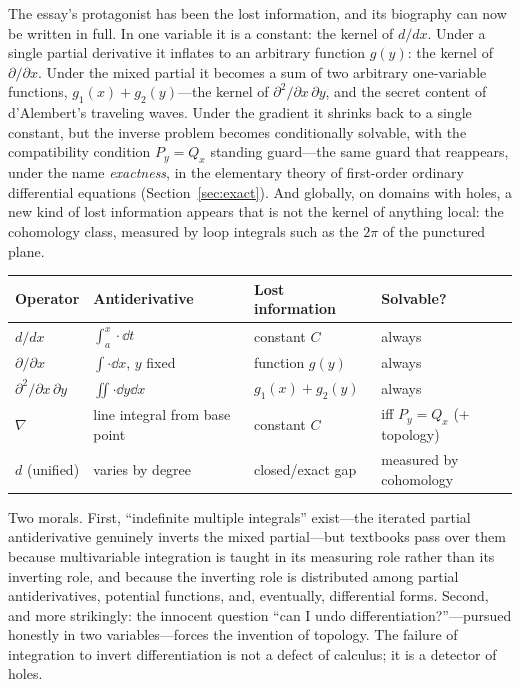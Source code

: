 \documentclass{essay}
\begin{document}
The essay's protagonist has been the lost information, and its biography can now be written in full. In one variable it is a constant: the kernel of $d/dx$. Under a single partial derivative it inflates to an arbitrary function $g(y)$: the kernel of $\partial/\partial x$. Under the mixed partial it becomes a sum of two arbitrary one-variable functions, $g_1(x) + g_2(y)$---the kernel of $\partial^2/\partial x\,\partial y$, and the secret content of d'Alembert's traveling waves. Under the gradient it shrinks back to a single constant, but the inverse problem becomes conditionally solvable, with the compatibility condition $P_y = Q_x$ standing guard---the same guard that reappears, under the name \emph{exactness}, in the elementary theory of first-order ordinary differential equations (Section~\ref{sec:exact}). And globally, on domains with holes, a new kind of lost information appears that is not the kernel of anything local: the cohomology class, measured by loop integrals such as the $2\pi$ of the punctured plane.

\begin{center}
  \begin{tabular}{@{}llll@{}}
    \toprule
    Operator & Antiderivative & Lost information & Solvable? \\
    \midrule
    $d/dx$ & $\int_a^x \cdot \dd t$ & constant $C$ & always \\
    $\partial/\partial x$ & $\int \cdot \dd x$, $y$ fixed & function $g(y)$ & always \\
    $\partial^2/\partial x\,\partial y$ & $\iint \cdot \dd y\dd x$ & $g_1(x) + g_2(y)$ & always \\
    $\nabla$ & line integral from base point & constant $C$ & iff $P_y = Q_x$ (+ topology) \\
    $d$ (unified) & varies by degree & closed/exact gap & measured by cohomology \\
    \bottomrule
  \end{tabular}
\end{center}

Two morals. First, ``indefinite multiple integrals'' exist---the iterated partial antiderivative genuinely inverts the mixed partial---but textbooks pass over them because multivariable integration is taught in its measuring role rather than its inverting role, and because the inverting role is distributed among partial antiderivatives, potential functions, and, eventually, differential forms. Second, and more strikingly: the innocent question ``can I undo differentiation?''---pursued honestly in two variables---forces the invention of topology. The failure of integration to invert differentiation is not a defect of calculus; it is a detector of holes.
\end{document}
